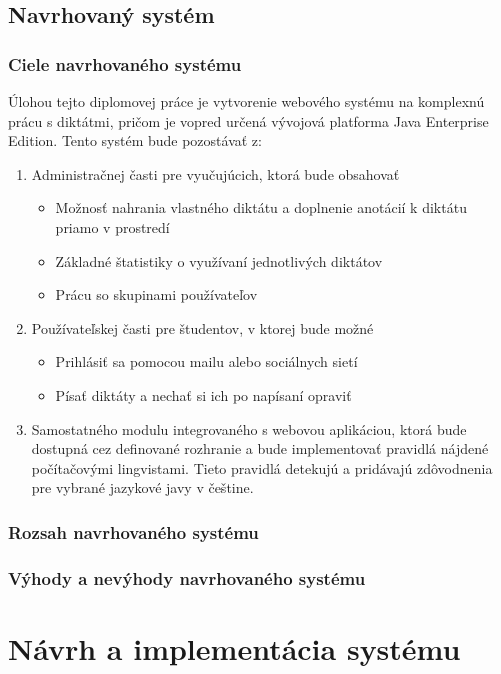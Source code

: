 \documentclass[12pt,oneside]{fithesis2}
\begin{document}
       \section{Navrhovaný systém}
       		\subsection{Ciele navrhovaného systému} \label{spec-app}
       		
Úlohou tejto diplomovej práce je vytvorenie webového systému na komplexnú prácu s diktátmi, pričom je vopred určená vývojová platforma Java Enterprise Edition. Tento systém bude pozostávať z:

\begin{enumerate}
\item Administračnej časti pre vyučujúcich, ktorá bude obsahovať
	\begin{itemize}
	\item Možnosť nahrania vlastného diktátu a doplnenie anotácií k diktátu priamo v prostredí
	\item Základné štatistiky o využívaní jednotlivých diktátov
	\item Prácu so skupinami používateľov
	\end{itemize}
\item Používateľskej časti pre študentov, v ktorej bude možné
	\begin{itemize}
	\item Prihlásiť sa pomocou mailu alebo sociálnych sietí
	\item Písať diktáty a nechať si ich po napísaní opraviť
	\end{itemize}
\item Samostatného modulu integrovaného s webovou aplikáciou, ktorá bude dostupná cez definované rozhranie a bude implementovať pravidlá nájdené počítačovými lingvistami. Tieto pravidlá detekujú a pridávajú zdôvodnenia pre vybrané jazykové javy v češtine.
\end{enumerate}
       		
       		\subsection{Rozsah navrhovaného systému}
       		\subsection{Výhody a nevýhody navrhovaného systému}
    \chapter{Návrh a implementácia systému}
    
\end{document}
